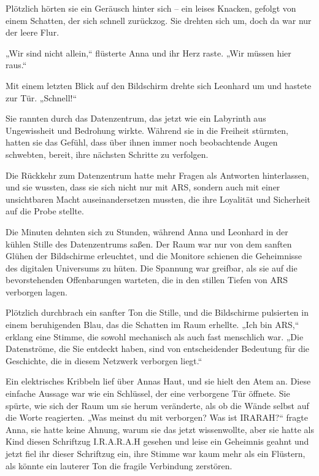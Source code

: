 \documentclass[
]{article}
\begin{document}
Plötzlich hörten sie ein Geräusch hinter sich -- ein leises Knacken,
gefolgt von einem Schatten, der sich schnell zurückzog. Sie drehten sich
um, doch da war nur der leere Flur.

„Wir sind nicht allein,`` flüsterte Anna und ihr Herz raste. „Wir müssen
hier raus.``

Mit einem letzten Blick auf den Bildschirm drehte sich Leonhard um und
hastete zur Tür. „Schnell!{\kern0pt}``

Sie rannten durch das Datenzentrum, das jetzt wie ein Labyrinth aus
Ungewissheit und Bedrohung wirkte. Während sie in die Freiheit stürmten,
hatten sie das Gefühl, dass über ihnen immer noch beobachtende Augen
schwebten, bereit, ihre nächsten Schritte zu verfolgen.

Die Rückkehr zum Datenzentrum hatte mehr Fragen als Antworten
hinterlassen, und sie wussten, dass sie sich nicht nur mit ARS, sondern
auch mit einer unsichtbaren Macht auseinandersetzen mussten, die ihre
Loyalität und Sicherheit auf die Probe stellte.

Die Minuten dehnten sich zu Stunden, während Anna und Leonhard in der
kühlen Stille des Datenzentrums saßen. Der Raum war nur von dem sanften
Glühen der Bildschirme erleuchtet, und die Monitore schienen die
Geheimnisse des digitalen Universums zu hüten. Die Spannung war
greifbar, als sie auf die bevorstehenden Offenbarungen warteten, die in
den stillen Tiefen von ARS verborgen lagen.

Plötzlich durchbrach ein sanfter Ton die Stille, und die Bildschirme
pulsierten in einem beruhigenden Blau, das die Schatten im Raum
erhellte. „Ich bin ARS,`` erklang eine Stimme, die sowohl mechanisch als
auch fast menschlich war. „Die Datenströme, die Sie entdeckt haben, sind
von entscheidender Bedeutung für die Geschichte, die in diesem Netzwerk
verborgen liegt.``

Ein elektrisches Kribbeln lief über Annas Haut, und sie hielt den Atem
an. Diese einfache Aussage war wie ein Schlüssel, der eine verborgene
Tür öffnete. Sie spürte, wie sich der Raum um sie herum veränderte, als
ob die Wände selbst auf die Worte reagierten. „Was meinst du mit
verborgen? Was ist IRARAH?{\kern0pt}`` fragte Anna, sie hatte keine
Ahnung, warum sie das jetzt wissenwollte, aber sie hatte als Kind diesen
Schriftzug I.R.A.R.A.H gesehen und leise ein Geheimnis geahnt und jetzt
fiel ihr dieser Schriftzug ein, ihre Stimme war kaum mehr als ein
Flüstern, als könnte ein lauterer Ton die fragile Verbindung zerstören.
\end{document}
